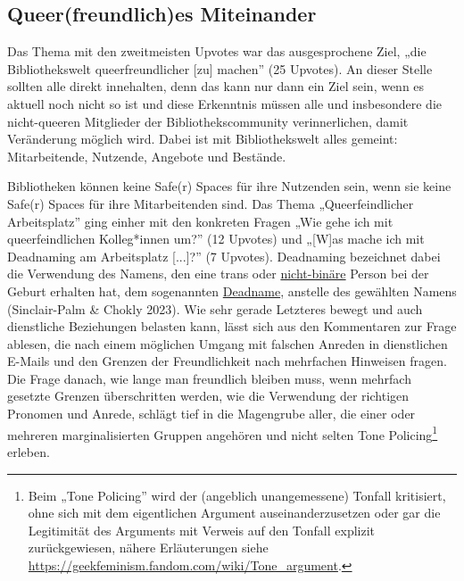 \documentclass[a4paper,
fontsize=11pt,
oneside,
numbers=noperiodatend,
parskip=half-,
bibliography=totoc,
final
]{scrartcl}
\begin{document}
\subsection{Queer(freundlich)es
Miteinander}\label{queerfreundliches-miteinander}

Das Thema mit den zweitmeisten Upvotes war das ausgesprochene Ziel, „die
Bibliothekswelt queerfreundlicher {[}zu{]} machen'' (25 Upvotes). An
dieser Stelle sollten alle direkt innehalten, denn das kann nur dann ein
Ziel sein, wenn es aktuell noch nicht so ist und diese Erkenntnis müssen
alle und insbesondere die nicht-queeren Mitglieder der
Bibliothekscommunity verinnerlichen, damit Veränderung möglich wird.
Dabei ist mit Bibliothekswelt alles gemeint: Mitarbeitende, Nutzende,
Angebote und Bestände.

Bibliotheken können keine Safe(r) Spaces für ihre Nutzenden sein, wenn
sie keine Safe(r) Spaces für ihre Mitarbeitenden sind. Das Thema
„Queerfeindlicher Arbeitsplatz'' ging einher mit den konkreten Fragen
„Wie gehe ich mit queerfeindlichen Kolleg*innen um?'' (12 Upvotes) und
„{[}W{]}as mache ich mit Deadnaming am Arbeitsplatz {[}...{]}?'' (7
Upvotes). Deadnaming bezeichnet dabei die Verwendung des Namens, den
eine trans oder
\href{https://queer-lexikon.net/2017/06/08/nichtbinaer/}{nicht-binäre}
Person bei der Geburt erhalten hat, dem sogenannten
\href{https://queer-lexikon.net/2019/12/23/deadname/}{Deadname},
anstelle des gewählten Namens (Sinclair-Palm \& Chokly 2023). Wie sehr
gerade Letzteres bewegt und auch dienstliche Beziehungen belasten kann,
lässt sich aus den Kommentaren zur Frage ablesen, die nach einem
möglichen Umgang mit falschen Anreden in dienstlichen E-Mails und den
Grenzen der Freundlichkeit nach mehrfachen Hinweisen fragen. Die Frage
danach, wie lange man freundlich bleiben muss, wenn mehrfach gesetzte
Grenzen überschritten werden, wie die Verwendung der richtigen Pronomen
und Anrede, schlägt tief in die Magengrube aller, die einer oder
mehreren marginalisierten Gruppen angehören und nicht selten Tone
Policing\footnote{Beim „Tone Policing'' wird der (angeblich
  unangemessene) Tonfall kritisiert, ohne sich mit dem eigentlichen
  Argument auseinanderzusetzen oder gar die Legitimität des Arguments
  mit Verweis auf den Tonfall explizit zurückgewiesen, nähere
  Erläuterungen siehe
  \url{https://geekfeminism.fandom.com/wiki/Tone_argument}.} erleben.
\end{document}
